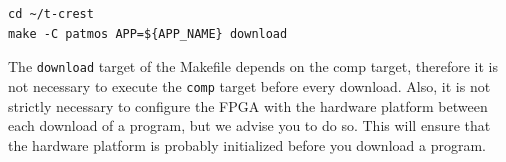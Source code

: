 \documentclass[a4paper,fontsize=10pt,twoside,DIV15,BCOR12mm,headinclude=true,footinclude=false,pagesize,bibtotoc]{scrbook}
\newcommand{\code}[1]{{\texttt{#1}}}
\begin{document}
\begin{Verbatim}
cd ~/t-crest
make -C patmos APP=${APP_NAME} download
\end{Verbatim}

The \code{download} target of the Makefile depends on the comp target,
therefore it is not necessary to execute the \code{comp} target before every download.
Also, it is not strictly necessary to configure the FPGA with the hardware
platform between each download of a program, but we advise you to do so.
This will ensure that the hardware platform is probably initialized
before you download a program.




%

\end{document}
